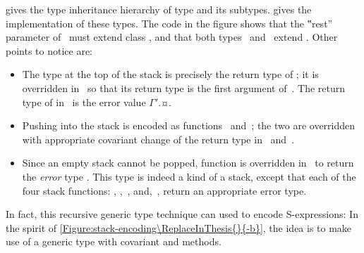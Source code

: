  gives the type inheritance hierarchy 
of type  and its subtypes.
gives the implementation of these types.
The code in the figure shows that the ‟rest” parameter of~ must extend class ,
  and that both types~ and~ extend .
Other points to notice are:
\begin{itemize}
  \item The type at the top of the stack is precisely the return type of ;
        it is overridden in~ so that its return type is the first argument of~.
        The return type of  in~ is the error value {$Γ'$.¤}.
  \item Pushing into the stack is encoded as functions~ and~;
        the two are overridden with appropriate covariant change of the return type in~ and~.
  \item Since an empty stack cannot be popped, function  is overridden in~ to return
    the \emph{error} type . This type is indeed a kind of a stack, except that each of the four stack
        functions: , ,~, and,~, return an appropriate error type.
\end{itemize}
In fact, this recursive generic type technique can used to encode S-expressions: In the spirit of
  \cref{Figure:stack-encoding\ReplaceInThesis{}{-b}}, the idea is to make use of a  generic type
  with covariant  and  methods.

